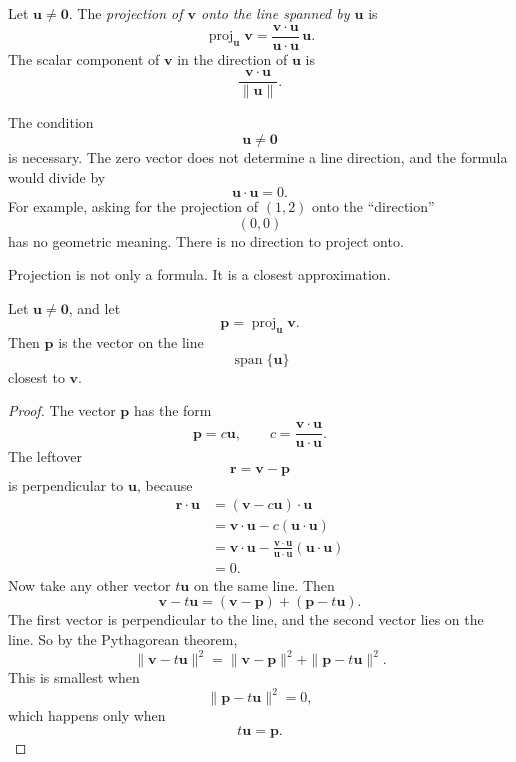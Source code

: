 \begin{definition}
Let \(\mathbf u\neq \mathbf 0\).  The \emph{projection of \(\mathbf v\) onto the line
spanned by \(\mathbf u\)} is
\[
\boxed{
    \operatorname{proj}_{\mathbf u}\mathbf v
    =
    \frac{\mathbf v\cdot\mathbf u}{\mathbf u\cdot\mathbf u}\,\mathbf u.
}
\]
The scalar component of \(\mathbf v\) in the direction of \(\mathbf u\) is
\[
    \frac{\mathbf v\cdot\mathbf u}{\|\mathbf u\|}.
\]
\end{definition}

The condition
\[
    \mathbf u\neq\mathbf 0
\]
is necessary.  The zero vector does not determine a line direction, and the formula
would divide by
\[
    \mathbf u\cdot\mathbf u=0.
\]
For example, asking for the projection of \((1,2)\) onto the ``direction''
\[
    (0,0)
\]
has no geometric meaning.  There is no direction to project onto.

Projection is not only a formula.  It is a closest approximation.

\begin{theorem}
Let \(\mathbf u\neq\mathbf 0\), and let
\[
    \mathbf p=\operatorname{proj}_{\mathbf u}\mathbf v.
\]
Then \(\mathbf p\) is the vector on the line
\[
    \operatorname{span}\{\mathbf u\}
\]
closest to \(\mathbf v\).
\end{theorem}

\begin{proof}
The vector \(\mathbf p\) has the form
\[
    \mathbf p=c\mathbf u,
    \qquad
    c=\frac{\mathbf v\cdot\mathbf u}{\mathbf u\cdot\mathbf u}.
\]
The leftover
\[
    \mathbf r=\mathbf v-\mathbf p
\]
is perpendicular to \(\mathbf u\), because
\[
\begin{aligned}
\mathbf r\cdot\mathbf u
&=
(\mathbf v-c\mathbf u)\cdot\mathbf u\\
&=
\mathbf v\cdot\mathbf u
-
c(\mathbf u\cdot\mathbf u)\\
&=
\mathbf v\cdot\mathbf u
-
\frac{\mathbf v\cdot\mathbf u}{\mathbf u\cdot\mathbf u}
(\mathbf u\cdot\mathbf u)\\
&=0.
\end{aligned}
\]
Now take any other vector \(t\mathbf u\) on the same line.  Then
\[
    \mathbf v-t\mathbf u
    =
    (\mathbf v-\mathbf p)+(\mathbf p-t\mathbf u).
\]
The first vector is perpendicular to the line, and the second vector lies on the line.
So by the Pythagorean theorem,
\[
    \|\mathbf v-t\mathbf u\|^2
    =
    \|\mathbf v-\mathbf p\|^2
    +
    \|\mathbf p-t\mathbf u\|^2.
\]
This is smallest when
\[
    \|\mathbf p-t\mathbf u\|^2=0,
\]
which happens only when
\[
    t\mathbf u=\mathbf p.
\]
\end{proof}

